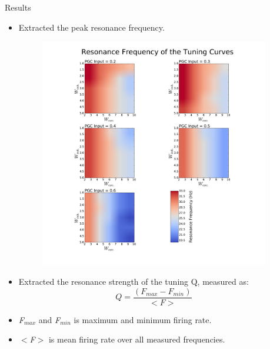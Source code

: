 \documentclass[final,hyperref={pdfpagelabels=false}]{beamer}
\begin{document}
\begin{frame}{}
\begin{columns}[t]
\begin{column}{.48\linewidth}
\end{column}
\begin{column}{.48\linewidth}

\begin{block}{Results}
\begin{itemize}
\item Extracted the peak resonance frequency.
\begin{figure}
\center
\includegraphics[scale=0.55]{images/Contour_plot_tuning_frequency}
\end{figure}
\item Extracted the resonance strength of the tuning Q, measured as:
\[
\textit{Q} = \frac{(\textit{F}_{max} - \textit{F}_{min})}{<\textit{F}>}
\]
\item \textit{F}$_{max}$ and \textit{F}$_{min}$ is maximum and minimum firing rate.
\item $<$\textit{F}$>$ is mean firing rate over all measured frequencies.
\end{itemize}
\begin{figure}
\center

\end{figure}
\end{block}
\end{column}
\end{columns}
\end{frame}
\end{document}
